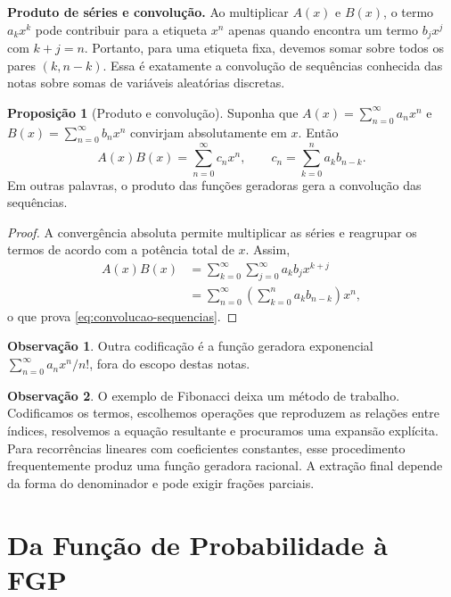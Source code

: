 \documentclass[12pt,portuguese]{article}
\theoremstyle{definition}
\newtheorem{proposition}[proposition]{Proposição}
\newtheorem{remark}[remark]{Observação}
\theoremstyle{plainexercise}
\theoremstyle{starredexercise}
\theoremstyle{definition}
\begin{document}
\medskip
\noindent\textbf{Produto de séries e convolução.}
Ao multiplicar $A(x)$ e $B(x)$, o termo $a_kx^k$ pode contribuir para a
etiqueta $x^n$ apenas quando encontra um termo $b_jx^j$ com $k+j=n$.
Portanto, para uma etiqueta fixa, devemos somar sobre todos os pares
$(k,n-k)$. Essa é exatamente a convolução de sequências conhecida das notas
sobre somas de variáveis aleatórias discretas.

\begin{proposition}[Produto e convolução]\label{prop:convolucao-sequencias}
Suponha que $A(x)=\sum_{n=0}^{\infty}a_nx^n$ e
$B(x)=\sum_{n=0}^{\infty}b_nx^n$ convirjam absolutamente em $x$. Então
\begin{equation}\label{eq:convolucao-sequencias}
A(x)B(x)=\sum_{n=0}^{\infty}c_nx^n,
\qquad
c_n=\sum_{k=0}^{n}a_kb_{n-k}.
\end{equation}
Em outras palavras, o produto das funções geradoras gera a convolução das
sequências.
\end{proposition}

\begin{proof}
A convergência absoluta permite multiplicar as séries e reagrupar os termos de
acordo com a potência total de $x$. Assim,
\begin{align*}
A(x)B(x)
&=\sum_{k=0}^{\infty}\sum_{j=0}^{\infty}
a_kb_jx^{k+j}
\\[0.3cm]
&=\sum_{n=0}^{\infty}
\left(\sum_{k=0}^{n}a_kb_{n-k}\right)x^n,
\end{align*}
o que prova \eqref{eq:convolucao-sequencias}.
\end{proof}

\begin{remark}\label{rem:funcao-geradora-exponencial}
Outra codificação é a função geradora exponencial $\sum_{n=0}^{\infty}a_nx^n/n!$, fora do escopo destas notas.
\end{remark}

\begin{remark}\label{rem:principio-geral}
O exemplo de Fibonacci deixa um método de trabalho. Codificamos os termos,
escolhemos operações que reproduzem as relações entre índices, resolvemos a
equação resultante e procuramos uma expansão explícita. Para recorrências
lineares com coeficientes constantes, esse procedimento frequentemente produz
uma função geradora racional. A extração
final depende da forma do denominador e pode exigir frações parciais.
\end{remark}

\section{Da Função de Probabilidade à FGP}
\label{sec:funcao-geradora-probabilidade}
\end{document}
